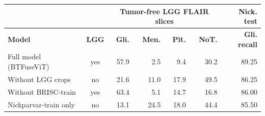 \begin{tabular}{>{\raggedright\arraybackslash}p{3.1cm} c r r r r r}
\toprule
& & \multicolumn{4}{c}{\textbf{Tumor-free LGG FLAIR slices}} & \textbf{Nick. test} \\
\cmidrule(lr){3-6}
\textbf{Model} & \textbf{LGG} & \textbf{Gli.} & \textbf{Men.} & \textbf{Pit.} & \textbf{NoT.} & \textbf{Gli. recall} \\
\midrule
Full model (BTFuseViT) & yes & 57.9 & 2.5 & 9.4 & 30.2 & 89.25 \\
Without LGG crops & no & 21.6 & 11.0 & 17.9 & 49.5 & 86.25 \\
Without BRISC-train & yes & 63.4 & 5.1 & 14.7 & 16.8 & 86.00 \\
Nickparvar-train only & no & 13.1 & 24.5 & 18.0 & 44.4 & 85.50 \\
\bottomrule
\end{tabular}
